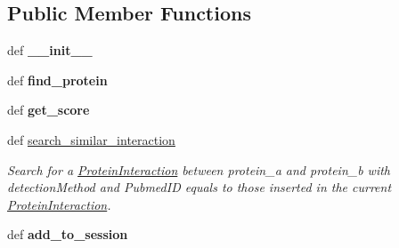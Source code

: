 \subsection*{Public Member Functions}
\begin{DoxyCompactItemize}
\item 
\hypertarget{classsrc_1_1fr_1_1tagc_1_1rainet_1_1core_1_1data_1_1ProteinInteraction_1_1ProteinInteraction_a2c9a4695d3a6e5ee98ec1fa621c550ab}{def {\bfseries \-\_\-\-\_\-init\-\_\-\-\_\-}}\label{classsrc_1_1fr_1_1tagc_1_1rainet_1_1core_1_1data_1_1ProteinInteraction_1_1ProteinInteraction_a2c9a4695d3a6e5ee98ec1fa621c550ab}

\item 
\hypertarget{classsrc_1_1fr_1_1tagc_1_1rainet_1_1core_1_1data_1_1ProteinInteraction_1_1ProteinInteraction_a0259ddff793989345d38527f481473db}{def {\bfseries find\-\_\-protein}}\label{classsrc_1_1fr_1_1tagc_1_1rainet_1_1core_1_1data_1_1ProteinInteraction_1_1ProteinInteraction_a0259ddff793989345d38527f481473db}

\item 
\hypertarget{classsrc_1_1fr_1_1tagc_1_1rainet_1_1core_1_1data_1_1ProteinInteraction_1_1ProteinInteraction_abe58b38d79ca113057af0b3f61a9fd48}{def {\bfseries get\-\_\-score}}\label{classsrc_1_1fr_1_1tagc_1_1rainet_1_1core_1_1data_1_1ProteinInteraction_1_1ProteinInteraction_abe58b38d79ca113057af0b3f61a9fd48}

\item 
def \hyperlink{classsrc_1_1fr_1_1tagc_1_1rainet_1_1core_1_1data_1_1ProteinInteraction_1_1ProteinInteraction_ad0940b6d04bd1be37b2f4f9e0e8d2dd1}{search\-\_\-similar\-\_\-interaction}
\begin{DoxyCompactList}\small\item\em Search for a \hyperlink{classsrc_1_1fr_1_1tagc_1_1rainet_1_1core_1_1data_1_1ProteinInteraction_1_1ProteinInteraction}{Protein\-Interaction} between protein\-\_\-a and protein\-\_\-b with detection\-Method and Pubmed\-I\-D equals to those inserted in the current \hyperlink{classsrc_1_1fr_1_1tagc_1_1rainet_1_1core_1_1data_1_1ProteinInteraction_1_1ProteinInteraction}{Protein\-Interaction}. \end{DoxyCompactList}\item 
\hypertarget{classsrc_1_1fr_1_1tagc_1_1rainet_1_1core_1_1data_1_1ProteinInteraction_1_1ProteinInteraction_afd1f787a30516b0bc94f31462f77b803}{def {\bfseries add\-\_\-to\-\_\-session}}\label{classsrc_1_1fr_1_1tagc_1_1rainet_1_1core_1_1data_1_1ProteinInteraction_1_1ProteinInteraction_afd1f787a30516b0bc94f31462f77b803}

\end{DoxyCompactItemize}
